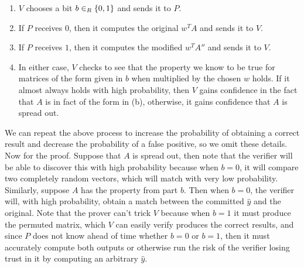 \documentclass{article}
\begin{document}
\begin{enumerate}[,start=5]
\begin{enumerate}[noitemsep,topsep=\mdcompacttopsep,label=\alph*.]
\begin{enumerate}[noitemsep,topsep=\mdcompacttopsep,label=\alph*.]
\item{}$V$ chooses a bit $b \in_R \{0,1\}$ and sends it to $P$.%

\item{}If $P$ receives $0$, then it computes the original $w^T A$ and sends it to $V$.%

\item{}If $P$ receives $1$, then it computes the modified $w^T A''$ and sends it to $V$.%

\item{}In either case, $V$ checks to see that the property we know to be true for matrices 
of the form given in $b$ when multiplied by the chosen $w$ holds. If it almost always holds
with high probability, then $V$ gains confidence in the fact that $A$ is in fact of the form
in (b), otherwise, it gains confidence that $A$ is spread out.%
\end{enumerate}%
\end{enumerate}%

We can repeat the above process to increase the probability of obtaining a correct result and
decrease the probability of a false positive, so we omit these details. Now for the proof. Suppose
that $A$ is spread out, then note that the verifier will be able to discover this with 
high probability because when $b = 0$, it will compare two completely random vectors, which will
match with very low probability. Similarly, suppose $A$ has the property from part $b$. Then 
when $b = 0$, the verifier will, with high probability, obtain a match between the committed $\hat{y}$
and the original. Note that the prover can't trick $V$ because when $b = 1$ it must produce 
the permuted matrix, which $V$ can easily verify produces the correct results, and since $P$
does not know ahead of time whether $b = 0$ or $b=1$, then it must accurately compute both 
outputs or otherwise run the risk of the verifier losing trust in it by computing an arbitrary
$\hat{y}$.%


\end{enumerate}
\end{document}
